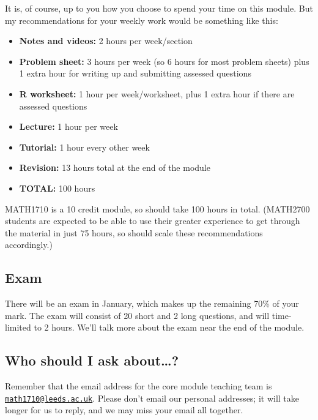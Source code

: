 \documentclass[
  a4paper,
]{book}
\providecommand{\tightlist}{%
  \setlength{\itemsep}{0pt}\setlength{\parskip}{0pt}}
\theoremstyle{definition}
\theoremstyle{definition}
\theoremstyle{definition}
\theoremstyle{remark}
\begin{document}
It is, of course, up to you how you choose to spend your time on this module. But my recommendations for your weekly work would be something like this:

\begin{itemize}
\tightlist
\item
  \textbf{Notes and videos:} 2 hours per week/section
\item
  \textbf{Problem sheet:} 3 hours per week (so 6 hours for most problem sheets) plus 1 extra hour for writing up and submitting assessed questions
\item
  \textbf{R worksheet:} 1 hour per week/worksheet, plus 1 extra hour if there are assessed questions
\item
  \textbf{Lecture:} 1 hour per week
\item
  \textbf{Tutorial:} 1 hour every other week
\item
  \textbf{Revision:} 13 hours total at the end of the module
\item
  \textbf{TOTAL:} 100 hours
\end{itemize}

MATH1710 is a 10 credit module, so should take 100 hours in total. (MATH2700 students are expected to be able to use their greater experience to get through the material in just 75 hours, so should scale these recommendations accordingly.)

\hypertarget{exam}{%
\subsection*{Exam}\label{exam}}

There will be an exam in January, which makes up the remaining 70\% of your mark. The exam will consist of 20 short and 2 long questions, and will time-limited to 2 hours. We'll talk more about the exam near the end of the module.

\hypertarget{ask}{%
\subsection*{Who should I ask about\ldots?}\label{ask}}

Remember that the email address for the core module teaching team is \href{mailto:math1710@leeds.ac.uk}{\nolinkurl{math1710@leeds.ac.uk}}. Please don't email our personal addresses; it will take longer for us to reply, and we may miss your email all together.
\end{document}
